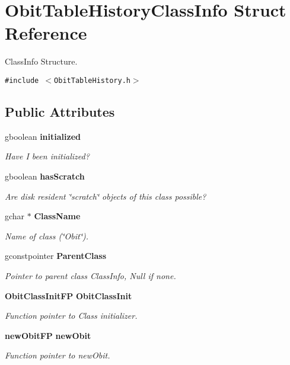 \section{Obit\-Table\-History\-Class\-Info Struct Reference}
\label{structObitTableHistoryClassInfo}
Class\-Info Structure.  


{\tt \#include $<$Obit\-Table\-History.h$>$}

\subsection*{Public Attributes}
\begin{CompactItemize}
\item 
gboolean {\bf initialized}
\begin{CompactList}\small\item\em Have I been initialized? \item\end{CompactList}\item 
gboolean {\bf has\-Scratch}
\begin{CompactList}\small\item\em Are disk resident \char`\"{}scratch\char`\"{} objects of this class possible? \item\end{CompactList}\item 
gchar $\ast$ {\bf Class\-Name}
\begin{CompactList}\small\item\em Name of class (\char`\"{}Obit\char`\"{}). \item\end{CompactList}\item 
gconstpointer {\bf Parent\-Class}
\begin{CompactList}\small\item\em Pointer to parent class Class\-Info, Null if none. \item\end{CompactList}\item 
{\bf Obit\-Class\-Init\-FP} {\bf Obit\-Class\-Init}
\begin{CompactList}\small\item\em Function pointer to Class initializer. \item\end{CompactList}\item 
{\bf new\-Obit\-FP} {\bf new\-Obit}
\begin{CompactList}\small\item\em Function pointer to new\-Obit. \item\end{CompactList}\item 

\end{CompactItemize}
